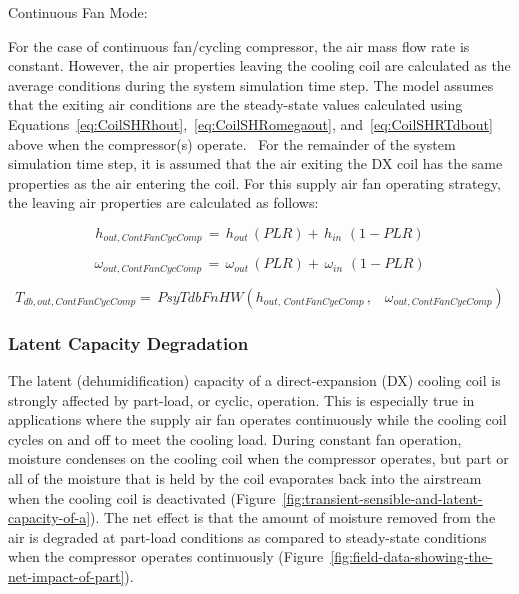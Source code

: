 Continuous Fan Mode:

For the case of continuous fan/cycling compressor, the air mass flow rate is constant. However, the air properties leaving the cooling coil are calculated as the average conditions during the system simulation time step. The model assumes that the exiting air conditions are the steady-state values calculated using Equations~\ref{eq:CoilSHRhout},~\ref{eq:CoilSHRomegaout}, and~\ref{eq:CoilSHRTdbout} above when the compressor(s) operate.~ For the remainder of the system simulation time step, it is assumed that the air exiting the DX coil has the same properties as the air entering the coil. For this supply air fan operating strategy, the leaving air properties are calculated as follows:

\begin{equation}
{h_{out,ContFanCycComp}}\, = \,{h_{out}}\,\left( {PLR} \right) + \,{h_{in}}\,\,\left( {1 - PLR} \right)
\label{eq:CoilhoutContFanCycComp}
\end{equation}

\begin{equation}
{\omega_{out,ContFanCycComp}}\, = \,{\omega_{out}}\,\left( {PLR} \right) + \,{\omega_{in}}\,\,\left( {1 - PLR} \right)
\end{equation}

\begin{equation}
{T_{db,out,ContFanCycComp}} = \,PsyTdbFnHW({h_{out,\,ContFanCycComp}}\,,\,\,\,\,\,{\omega_{out,ContFanCycComp}})
\label{eq:CoilTdboutContFanCycComp}
\end{equation}

\subsubsection{Latent Capacity Degradation}\label{latent-capacity-degradation}

The latent (dehumidification) capacity of a direct-expansion (DX) cooling coil is strongly affected by part-load, or cyclic, operation. This is especially true in applications where the supply air fan operates continuously while the cooling coil cycles on and off to meet the cooling load. During constant fan operation, moisture condenses on the cooling coil when the compressor operates, but part or all of the moisture that is held by the coil evaporates back into the airstream when the cooling coil is deactivated (Figure~\ref{fig:transient-sensible-and-latent-capacity-of-a}). The net effect is that the amount of moisture removed from the air is degraded at part-load conditions as compared to steady-state conditions when the compressor operates continuously (Figure~\ref{fig:field-data-showing-the-net-impact-of-part}).

